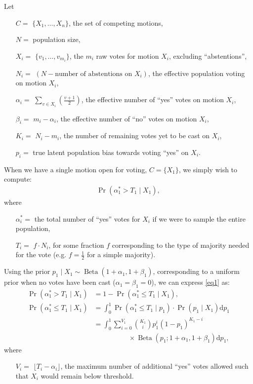 \documentclass{sigchi}
\begin{document}
Let
\begin{description}
\begin{itemize}
\item[$C = $] $\{X_1,\ldots, X_n\}$, the set of competing motions,
\item[$N = $] population size,
\item[$X_i = $] $\{v_1, \ldots, v_{m_i}\}$, the $m_i$ raw votes for motion $X_i$, excluding ``abstentions'',
\item[$N_i = $] $(N - \textrm{number of abstentions on } X_i)$, the effective population voting on motion $X_i$,
\item[$\alpha_i = $] $\sum\limits_{v \in X_i} \left(\frac{v+1}{2}\right)$, the effective number of ``yes'' votes on motion $X_i$,
\item[$\beta_i = $] $m_i - \alpha_i$, the effective number of ``no'' votes on motion $X_i$,
\item[$K_i = $] $N_i - m_i$, the number of remaining votes yet to be cast on $X_i$,
\item[$p_i = $] true latent population bias towards voting ``yes'' on $X_i$.
\end{itemize}
\end{description}

When we have a single motion open for voting, $C=\{X_1\}$, we simply wish to compute:
\begin{align}\label{eq1}
\Pr(\alpha^*_1 > T_1 \mid X_1),
\end{align}
where
\begin{description}
\begin{itemize}
\item[$\alpha^*_i = $] the total number of ``yes'' votes for $X_i$ if we were to sample the entire population,
\item[$T_i = $] $f \cdot N_i$, for some fraction $f$ corresponding to the type of majority needed for the vote
(e.g. $f=\frac{1}{2}$ for a simple majority).
\end{itemize}
\end{description}
Using the prior $p_1 \mid X_1 \sim \operatorname{Beta}(1+\alpha_1,1+\beta_1)$, corresponding to a uniform prior when
no votes have been cast ($\alpha_1 = \beta_1 = 0$), we can express \eqref{eq1} as:
\begin{align*}
\Pr(\alpha^*_1 > T_1 \mid X_1) &= 1 - \Pr(\alpha^*_1 \leq T_1 \mid X_1),\\
\Pr(\alpha^*_1 \leq T_1 \mid X_1) &= \int_0^1 \Pr(\alpha^*_1 \leq T_1 \mid p_1)\cdot \Pr(p_1 \mid X_1) \mathrm{d}p_1\\
&= \int_0^1 \sum\limits_{i=0}^{V_1} {K_1 \choose i} p_1^{i} {(1-p_1)}^{K_1-i} \\
& \qquad\qquad\quad \times \operatorname{Beta}(p_1; 1+\alpha_1,1+\beta_1) \mathrm{d}p_1,
\end{align*}
where
\begin{description}
\begin{itemize}
\item[$V_i = $] $\lfloor{T_i - \alpha_i}\rfloor$, the maximum number of additional ``yes'' votes allowed such that
$X_i$ would remain below threshold.
\end{itemize}
\end{description}
\end{document}

